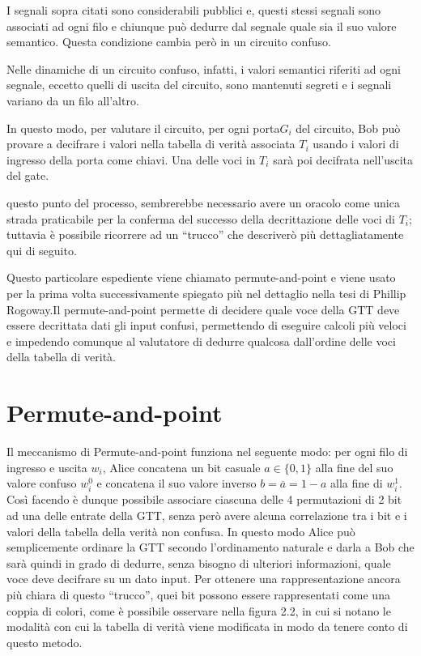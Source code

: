 \documentclass[
  italian,
]{book}
\begin{document}
I segnali sopra citati sono considerabili pubblici e, questi stessi segnali sono associati ad ogni filo e chiunque può dedurre dal segnale quale sia il suo valore semantico. Questa condizione cambia però in un circuito confuso.

Nelle dinamiche di un circuito confuso, infatti, i valori semantici riferiti ad ogni segnale, eccetto quelli di uscita del circuito, sono mantenuti segreti e i segnali variano da un filo all'altro.

In questo modo, per valutare il circuito, per ogni porta\(G_i\) del circuito, Bob può provare a decifrare i valori nella tabella di verità associata \(T_i\) usando i valori di ingresso della porta come chiavi. Una delle voci in \(T_i\) sarà poi decifrata nell'uscita del gate.

questo punto del processo, sembrerebbe necessario avere un oracolo come unica strada praticabile per la conferma del successo della decrittazione delle voci di \(T_i\); tuttavia è possibile ricorrere ad un ``trucco'' che descriverò più dettagliatamente qui di seguito.

Questo particolare espediente viene chiamato permute-and-point e viene usato per la prima volta \citep{fval} successivamente spiegato più nel dettaglio nella tesi di Phillip Rogoway\citep{prog}.Il permute-and-point permette di decidere quale voce della GTT deve essere decrittata dati gli input confusi, permettendo di eseguire calcoli più veloci e impedendo comunque al valutatore di dedurre qualcosa dall'ordine delle voci della tabella di verità.

\newpage

\hypertarget{permute-and-point}{%
\section{Permute-and-point}\label{permute-and-point}}

Il meccanismo di Permute-and-point funziona nel seguente modo: per ogni filo di ingresso e uscita \(w_i\), Alice concatena un bit casuale \(a \in \{0,1\}\) alla fine del suo valore confuso \(w^{0}_i\) e concatena il suo valore inverso \(b = \overline{a} = 1 - a\) alla fine di \(w^{1}_{i}\). Così facendo è dunque possibile associare ciascuna delle 4 permutazioni di 2 bit ad una delle entrate della GTT, senza però avere alcuna correlazione tra i bit e i valori della tabella della verità non confusa. In questo modo Alice può semplicemente ordinare la GTT secondo l'ordinamento naturale e darla a Bob che sarà quindi in grado di dedurre, senza bisogno di ulteriori informazioni, quale voce deve decifrare su un dato input. Per ottenere una rappresentazione ancora più chiara di questo ``trucco'', quei bit possono essere rappresentati come una coppia di colori, come è possibile osservare nella figura 2.2, in cui si notano le modalità con cui la tabella di verità viene modificata in modo da tenere conto di questo metodo.
\end{document}
